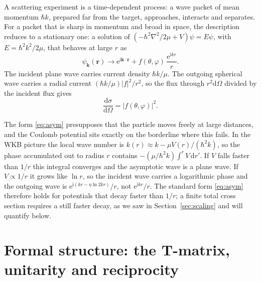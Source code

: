 \documentclass[11pt,a4paper]{book}
\numberwithin{equation}{chapter}
\newcommand{\dd}{\mathrm{d}}
\newcommand{\ii}{\mathrm{i}}
\newcommand{\ee}{\mathrm{e}}
\newcommand{\vk}{\bm{k}}
\newcommand{\vr}{\bm{r}}
\newcommand{\dsdO}{\frac{\dd\sigma}{\dd\Omega}}
\begin{document}
A scattering experiment is a time-dependent process: a wave packet of mean
momentum $\hbar k$, prepared far from the target, approaches, interacts and
separates. For a packet that is sharp in momentum and broad in space, the
description reduces to a stationary one: a solution of
$(-\hbar^2\nabla^2/2\mu+V)\psi=E\psi$, with $E=\hbar^2k^2/2\mu$, that behaves
at large $r$ as
\begin{equation}\label{eq:asym}
  \psi_{\vk}(\vr)\to \ee^{\ii\vk\cdot\vr}+f(\theta,\varphi)\,\frac{\ee^{\ii kr}}{r}.
\end{equation}
The incident plane wave carries current density $\hbar k/\mu$. The outgoing
spherical wave carries a radial current $(\hbar k/\mu)|f|^2/r^2$, so the flux
through $r^2\dd\Omega$ divided by the incident flux gives
\begin{equation}\label{eq:xs-f}
  \dsdO=|f(\theta,\varphi)|^2 .
\end{equation}

The form \eqref{eq:asym} presupposes that the particle moves freely at large
distances, and the Coulomb potential sits exactly on the borderline where this
fails. In the WKB picture the local wave number is
$k(r)\approx k-\mu V(r)/(\hbar^2k)$, so the phase accumulated out to radius $r$
contains $-(\mu/\hbar^2k)\int^{r}V\,\dd r'$. If $V$ falls faster than $1/r$ this
integral converges and the asymptotic wave is a plane wave. If $V\propto1/r$ it
grows like $\ln r$, so the incident wave carries a logarithmic phase and the
outgoing wave is $\ee^{\ii(kr-\eta\ln2kr)}/r$, not $\ee^{\ii kr}/r$. The
standard form \eqref{eq:asym} therefore holds for potentials that decay faster
than $1/r$; a finite total cross section requires a still faster decay, as we
saw in Section~\ref{sec:scaling} and will quantify below.

\section{Formal structure: the T-matrix, unitarity and reciprocity}
\end{document}
